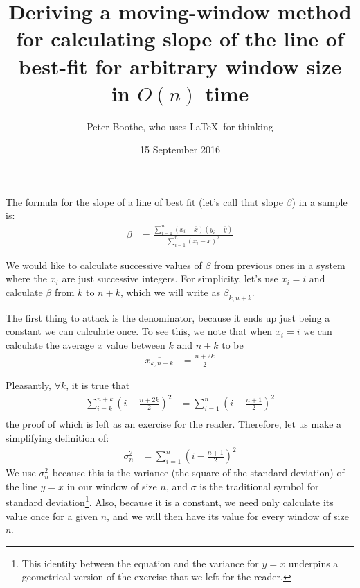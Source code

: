 \documentclass{article}
\title{Deriving a moving-window method for calculating slope of the line of best-fit for arbitrary window size in $O(n)$ time}
\author{Peter Boothe, who uses \LaTeX\ for thinking}
\date{15 September 2016}
\begin{document}
\maketitle

The formula for the slope of a line of best fit (let's call that slope $\beta$) in a sample is:
\begin{align*}
\beta &= \frac{\sum_{i=1}^n\left(x_i - \overline{x}\right)\left(y_i-\overline{y}\right)}{\sum_{i=1}^n\left(x_i - \overline{x}\right)^2}
\end{align*}

We would like to calculate successive values of $\beta$ from previous ones in a system where the $x_i$ are just successive integers. For simplicity, let's use $x_i = i$ and calculate $\beta$ from $k$ to $n+k$, which we will write as $\beta_{k,n+k}$.

The first thing to attack is the denominator, because it ends up just being a constant we can calculate once.  To see this, we note that when $x_i = i$ we can calculate the average $x$ value between $k$ and $n+k$ to be
\begin{align*}
\overline{x_{k,n+k}} &= \frac{n+2k}2
\end{align*}

Pleasantly, $\forall k$, it is true that
\begin{align*}
\sum_{i=k}^{n+k}\left(i - \frac{n+2k}2\right)^2 &= \sum_{i=1}^{n}\left(i - \frac{n+1}2\right)^2 \\
\end{align*}
the proof of which is left as an exercise for the reader. Therefore, let us make a simplifying definition of: \begin{align*}\sigma^2_n &= \sum_{i=1}^n\left(i - \frac{n+1}{2}\right)^2\end{align*}  We use $\sigma^2_n$ because this is the variance (the square of the standard deviation) of the line $y=x$ in our window of size $n$, and $\sigma$ is the traditional symbol for standard deviation\footnote{This identity between the equation and the variance for $y=x$ underpins a geometrical version of the exercise that we left for the reader.}.  Also, because it is a constant, we need only calculate its value once for a given $n$, and we will then have its value for every window of size $n$.
\end{document}
